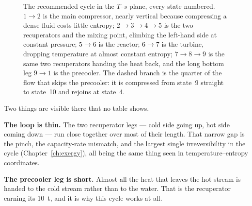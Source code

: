\documentclass[11pt,a4paper]{report}
\begin{document}
\begin{figure}[htbp]
\centering
{}
\caption{The recommended cycle in the $T$--$s$ plane, every state numbered.
$1 \to 2$ is the main compressor, nearly vertical because compressing a
dense fluid costs little entropy; $2 \to 3 \to 4 \to 5$ is the two
recuperators and the mixing point, climbing the left-hand side at constant
pressure; $5 \to 6$ is the reactor; $6 \to 7$ is the turbine, dropping
temperature at almost constant entropy; $7 \to 8 \to 9$ is the same two
recuperators handing the heat back, and the long bottom leg $9 \to 1$ is the
precooler. The dashed branch is the quarter of the flow that skips the
precooler: it is compressed from state~9 straight to state~10 and rejoins at
state~4.}
\label{fig:ts}
\end{figure}

Two things are visible there that no table shows.

\textbf{The loop is thin.} The two recuperator legs --- cold side going up,
hot side coming down --- run close together over most of their length. That
narrow gap is the pinch, the capacity-rate mismatch, and the
largest single irreversibility in the cycle (Chapter~\ref{ch:exergy}), all
being the same thing seen in temperature--entropy coordinates.

\textbf{The precooler leg is short.} Almost all the heat that leaves the hot
stream is handed to the cold stream rather than to the water. That is the
recuperator earning its \SI{10}{\tonne}, and it is why this cycle works at
all.
\end{document}
